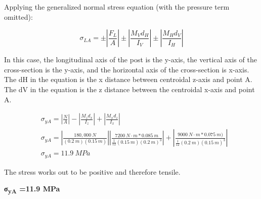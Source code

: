\documentclass[
  letterpaper,
  DIV=11,
  numbers=noendperiod]{scrreprt}
\theoremstyle{definition}
\theoremstyle{remark}
\begin{document}
\begin{tcolorbox}
\begin{tcolorbox}
Applying the generalized normal stress equation (with the pressure term
omitted):

\[
\sigma_{L A}= \pm\left|\frac{F_L}{A}\right| \pm\left|\frac{M_V d_H}{I_V}\right| \pm\left|\frac{M_H d_V}{I_H}\right|
\]

In this case, the longitudinal axis of the post is the y-axis, the
vertical axis of the cross-section is the y-axis, and the horizontal
axis of the cross-section is x-axis. The dH in the equation is the x
distance between centroidal z-axis and point A. The dV in the equation
is the z distance between the centroidal x-axis and point A.

\[
\begin{aligned}
&\sigma_{yA}=\left|\frac{N}{A}\right|-\left|\frac{M_z d_x}{I_z}\right|+\left|\frac{M_x d_z}{I_x}\right| \\
&\sigma_{yA}=\left|\frac{180,000{~N}}{(0.2{~m})(0.15{~m})}\right| \left|\frac{7200{~N}\cdot{m}*0.085{~m}}{\frac{1}{12}(0.15{~m})(0.2 {~m})^3}\right|+\left| \frac{9000{~N}\cdot{m}*0.075{~m})}{\frac{1}{12}(0.2{~m})(0.15{~m})^3}\right| \\
&\sigma_{y A}=11.9{~MPa}
\end{aligned}
\]

The stress works out to be positive and therefore tensile.

\textbf{σ\textsubscript{yA} =11.9 MPa}

\end{tcolorbox}

\end{tcolorbox}
\end{document}
